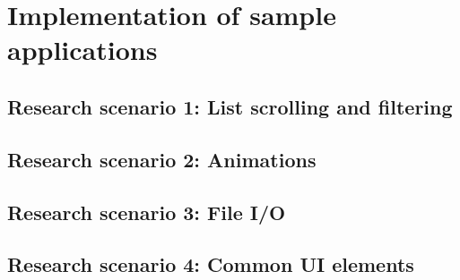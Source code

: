
\chapter{Implementation of sample applications}

\section{Research scenario 1: List scrolling and filtering}

\section{Research scenario 2: Animations}

\section{Research scenario 3: File I/O}

\section{Research scenario 4: Common UI elements}
